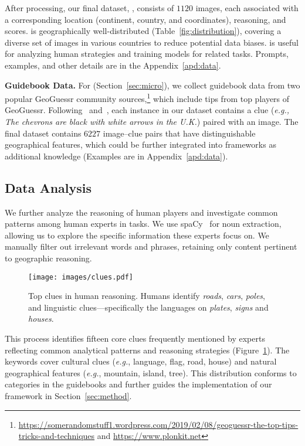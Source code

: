 After processing, our final dataset, \textbf{\dataname}, consists of $1120$ images, each associated with a corresponding location (continent, country, and coordinates), reasoning, and scores. \dataname is geographically well-distributed (Table~\ref{fig:distribution}), covering a diverse set of images in various countries to reduce potential data biases. \dataname is useful for analyzing human \geoloc strategies and training models for related tasks. Prompts, examples, and other details are in the Appendix~\ref{apd:data}.

\textbf{Guidebook Data.} For \micname (Section~\ref{sec:micro}), we collect guidebook data from two popular GeoGuessr community sources,\footnote{\url{https://somerandomstuff1.wordpress.com/2019/02/08/geoguessr-the-top-tips-tricks-and-techniques} and \url{https://www.plonkit.net}} which include tips from top players of GeoGuessr. Following~\citet{luo2022g} and~\citet{ligeoreasoner}, each instance in our dataset contains a clue (\textit{\textit{e.g.}, The chevrons are black with white arrows in the U.K.}) paired with an image. The final dataset contains $6227$ image--clue pairs that have distinguishable geographical features, which could be further integrated into \geoloc frameworks as additional knowledge (Examples are in Appendix~\ref{apd:data}).

\subsection{Data Analysis}
\label{sec:data_analysis}

We further analyze the reasoning of human players and investigate common patterns among human experts in \geoloc tasks. We use spaCy~\cite{honnibal2015improved} for noun extraction, allowing us to explore the specific information these experts focus on. We manually filter out irrelevant words and phrases, retaining only content pertinent to geographic reasoning.

\begin{figure}[t!]
    \centering
    \texttt{[image: images/clues.pdf]} 
    \caption{Top clues in human reasoning. Humans identify \textit{roads}, \textit{cars}, \textit{poles}, and linguistic clues---specifically the languages on \textit{plates}, \textit{signs} and \textit{houses}.}
    \label{fig:clue-type}
\end{figure}

This process identifies fifteen core clues frequently mentioned by experts reflecting common analytical patterns and reasoning strategies (Figure~\ref{fig:clue-type}). The keywords cover cultural clues (\textit{e.g.}, language, flag, road, house) and natural geographical features (\textit{e.g.}, mountain, island, tree). This distribution conforms to categories in the guidebooks and further guides the implementation of our framework in Section~\ref{sec:method}.